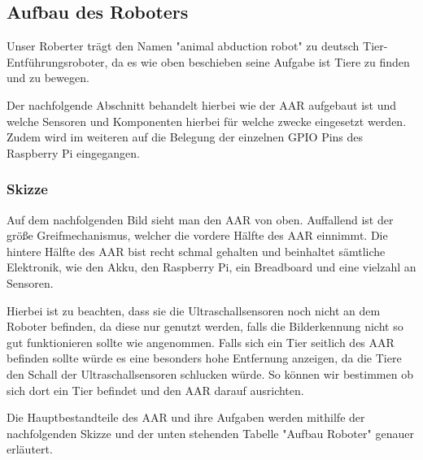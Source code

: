 \subsection{Aufbau des Roboters}
Unser Roberter trägt den Namen "animal abduction robot" zu deutsch Tier-Entführungsroboter, da es wie oben beschieben seine Aufgabe ist Tiere zu finden und zu bewegen.

Der nachfolgende Abschnitt behandelt hierbei wie der AAR aufgebaut ist und welche Sensoren und Komponenten hierbei für welche zwecke eingesetzt werden. Zudem wird im weiteren auf die Belegung der einzelnen GPIO Pins des Raspberry Pi eingegangen.

\subsubsection{Skizze}

Auf dem nachfolgenden Bild sieht man den AAR von oben. Auffallend ist der größe Greifmechanismus, welcher die vordere Hälfte des AAR einnimmt. Die hintere Hälfte des AAR bist recht schmal gehalten und beinhaltet sämtliche Elektronik, wie den Akku, den Raspberry Pi, ein Breadboard und eine vielzahl an Sensoren. 

Hierbei ist zu beachten, dass sie die Ultraschallsensoren noch nicht an dem Roboter befinden, da diese nur genutzt werden, falls die Bilderkennung nicht so gut funktionieren sollte wie angenommen.
Falls sich ein Tier seitlich des AAR befinden sollte würde es eine besonders hohe Entfernung anzeigen, da die Tiere den Schall der Ultraschallsensoren schlucken würde. So können wir bestimmen ob sich dort ein Tier befindet und den AAR darauf ausrichten. 

Die Hauptbestandteile des AAR und ihre Aufgaben werden mithilfe der nachfolgenden Skizze und der unten stehenden Tabelle "Aufbau Roboter" genauer erläutert.


